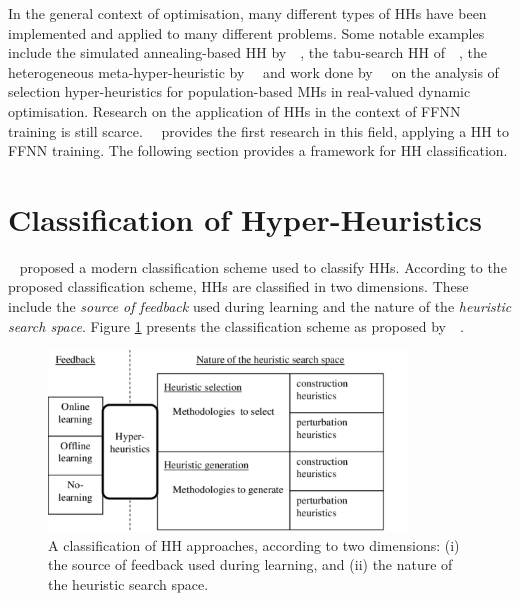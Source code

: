 In the general context of optimisation, many different types of \acp{HH} have been implemented and applied to many different problems. Some notable examples include the simulated annealing-based \acs{HH} by~\citeauthor{ref:dowsland:2007}~\cite{ref:dowsland:2007}, the tabu-search \acs{HH} of~\citeauthor{ref:burke:2010}~\cite{ref:burke:2010}, the heterogeneous meta-hyper-heuristic by~\citeauthor{ref:grobler:2012}~\cite{ref:grobler:2012} and work done by~\citeauthor{ref:vanderstockt:2018}~\cite{ref:vanderstockt:2018} on the analysis of selection hyper-heuristics for population-based \acp{MH} in real-valued dynamic optimisation. Research on the application of \acp{HH} in the context of \acs{FFNN} training is still scarce.~\citeauthor{ref:nel:2021}~\cite{ref:nel:2021} provides the first research in this field, applying a \acs{HH} to \acs{FFNN} training. The following section provides a framework for \acs{HH} classification.

\section{Classification of Hyper-Heuristics}\label{sec:hh:classification}

\citeauthor{ref:burke:2010}~\cite{ref:burke:2010} proposed a modern classification scheme used to classify \acp{HH}. According to the proposed classification scheme, \acp{HH} are classified in two dimensions. These include the \textit{source of feedback} used during learning and the nature of the \textit{heuristic search space}. Figure \ref{fig:heuristics:hh:classification} presents the classification scheme as proposed by~\citeauthor{ref:burke:2010}~\cite{ref:burke:2010}.

\begin{figure}[htbp]
      \centering
      \includegraphics[width=0.85\textwidth]{images/hh_classification.pdf}
      \caption{A classification of \acs{HH} approaches, according to two dimensions: (i) the source of feedback used during learning, and (ii) the nature of the heuristic search space.}
      \label{fig:heuristics:hh:classification}
\end{figure}

